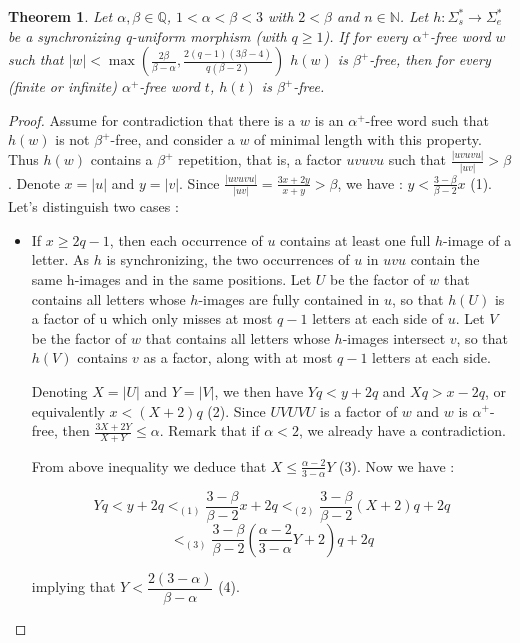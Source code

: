 \documentclass[a4paper]{article}
\newcommand{\N}{\mathbb{N}}
\newcommand{\Q}{\mathbb{Q}}
\newtheorem{theorem}{Theorem}[section]
\theoremstyle{definition}
\begin{document}
\begin{theorem}
\label{thm}
Let $\alpha, \beta \in \Q$, $1 < \alpha < \beta < 3$  with $2 < \beta$ and $n \in \N$. Let $h:\Sigma_s^* \rightarrow \Sigma_e^*$ be a synchronizing q-uniform morphism (with $q \geq 1$). If for every $\alpha^+$-free word $w$ such that $|w| < \max \left( \frac{2\beta}{\beta - \alpha}, \frac{2(q-1)(3\beta - 4)}{q(\beta - 2)} \right)$ $h(w)$ is $\beta^+$-free, then for every (finite or infinite) $\alpha^+$-free word $t$, $h(t)$ is $\beta^+$-free.
\end{theorem}
\begin{proof}
Assume for contradiction that there is a $w$ is an $\alpha^+$-free word such that $h(w)$ is not $\beta^+$-free, and consider a $w$ of minimal length with this property. Thus $h(w)$ contains a $\beta^+$ repetition, that is, a factor $uvuvu$ such that $\frac{|uvuvu|}{|uv|} > \beta$. Denote $x = |u|$ and $y = |v|$. Since $\frac{|uvuvu|}{|uv|} = \frac{3x+2y}{x+y} > \beta$, we have :
$y < \frac{3-\beta}{\beta-2}x$ (1). Let's distinguish two cases : 

\begin{itemize}

\item If $x \geq 2q-1$, then each occurrence of $u$ contains at least one full $h$-image of a letter. As $h$ is synchronizing, the two occurrences of $u$ in $uvu$ contain the same h-images and in the same positions. Let $U$ be the factor of $w$ that contains all letters whose $h$-images are fully contained in $u$, so that $h(U)$ is a factor of u which only misses at most $q-1$ letters at each side of $u$. Let $V$ be the factor of $w$ that contains all letters whose $h$-images intersect $v$, so that $h(V)$ contains $v$ as a factor, along with at most $q-1$ letters at each side.

Denoting $X = |U|$ and $Y = |V|$, we then have $Yq < y + 2q$ and $Xq > x - 2q$, or equivalently $x < (X + 2)q$ (2). Since $UVUVU$ is a factor of $w$ and $w$ is $\alpha^+$-free, then $\frac{3X+2Y}{X+Y} \le \alpha$. Remark that if $\alpha < 2$, we already have a contradiction.

From above inequality we deduce that $X \le \frac{\alpha-2}{3-\alpha}Y$ (3). Now we have :

$$ Yq < y + 2q <_{(1)} \frac{3-\beta}{\beta-2}x + 2q <_{(2)} \frac{3-\beta}{\beta-2}(X+2)q + 2q $$
$$ <_{(3)} \frac{3-\beta}{\beta-2}( \frac{\alpha-2}{3-\alpha}Y +2)q + 2q $$

implying that $ Y < \dfrac{2(3-\alpha)}{\beta- \alpha}$ (4).


\end{itemize}
\end{proof}
\end{document}
